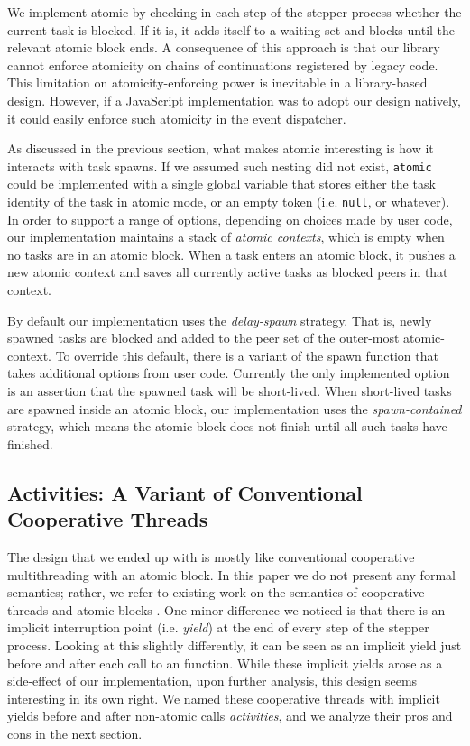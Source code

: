 \documentclass[acmsmall,anonymous,review]{acmart}\settopmatter{printfolios=true,printccs=false,printacmref=false}
\begin{document}
We implement atomic by checking in each step of the stepper process whether the current task is blocked.
If it is, it adds itself to a waiting set and blocks until the relevant atomic block ends.
A consequence of this approach is that our library cannot enforce atomicity on chains of continuations registered by legacy code.
This limitation on atomicity-enforcing power is inevitable in a library-based design.
However, if a JavaScript implementation was to adopt our design natively, it could easily enforce such atomicity in the event dispatcher.

As discussed in the previous section, what makes atomic interesting is how it interacts with task spawns.
If we assumed such nesting did not exist, \texttt{atomic} could be implemented with a single global variable that stores either the task identity of the task in atomic mode, or an empty token (i.e. \texttt{null}, or whatever).
In order to support a range of options, depending on choices made by user code, our implementation maintains a stack of \emph{atomic contexts}, which is empty when no tasks are in an atomic block.
When a task enters an atomic block, it pushes a new atomic context and saves all currently active tasks as blocked peers in that context.

By default our implementation uses the \emph{delay-spawn} strategy.
That is, newly spawned tasks are blocked and added to the peer set of the outer-most atomic-context.
To override this default, there is a variant of the spawn function that takes additional options from user code.
Currently the only implemented option is an assertion that the spawned task will be short-lived.
When short-lived tasks are spawned inside an atomic block, our implementation uses the \emph{spawn-contained} strategy, which means the atomic block does not finish until all such tasks have finished.

\subsection{Activities: A Variant of Conventional Cooperative Threads}

The design that we ended up with is mostly like conventional cooperative multithreading with an atomic block.
In this paper we do not present any formal semantics; rather, we refer to existing work on the semantics of cooperative threads \cite{Abadi2009} and atomic blocks \cite{Moore2008}.
One minor difference we noticed is that there is an implicit interruption point (i.e. \emph{yield}) at the end of every step of the stepper process.
Looking at this slightly differently, it can be seen as an implicit yield just before and after each call to an \asyncs{} function.
While these implicit yields arose as a side-effect of our implementation, upon further analysis, this design seems interesting in its own right.
We named these cooperative threads with implicit yields before and after non-atomic calls \emph{activities}, and we analyze their pros and cons in the next section.
\end{document}
